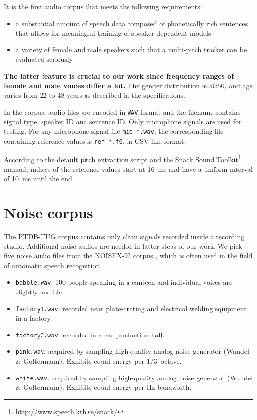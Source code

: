 \documentclass[11pt,a4paper]{report}
\begin{document}
It is the first audio corpus that meets the following requirements:

\begin{itemize}
  \item a substantial amount of speech data composed of phonetically rich sentences that allows for meaningful training of speaker-dependent models
  \item a variety of female and male speakers such that a multi-pitch tracker can be evaluated seriously
\end{itemize}

\textbf{The latter feature is crucial to our work since frequency ranges of female and male voices differ a lot.} The gender distribution is 50:50, and age varies from 22 to 48 years as described in the specifications.

\bigskip

In the corpus, audio files are encoded in \texttt{WAV} format and the filename contains signal type, speaker ID and sentence ID\@.
Only microphone signals are used for testing.
For any microphone signal file \texttt{mic\_*.wav}, the corresponding file containing reference values is \texttt{ref\_*.f0}, in CSV-like format.

According to the default pitch extraction script and the Snack Sound Toolkit\footnote{\url{http://www.speech.kth.se/snack/}} manual, indices of the reference values start at \SI{16}{\milli\second} and have a uniform interval of \SI{10}{\milli\second} until the end.

\section{Noise corpus}

The PTDB-TUG corpus contains only clean signals recorded inside a recording studio.
Additional noise audios are needed in latter steps of our work.
We pick five noise audio files from the NOISEX-92 corpus \parencite{varga1993assessment}, which is often used in the field of automatic speech recognition.

\begin{itemize}
  \item \texttt{babble.wav}: 100 people speaking in a canteen and individual voices are slightly audible.
  \item \texttt{factory1.wav}: recorded near plate-cutting and electrical welding equipment in a factory.
  \item \texttt{factory2.wav}: recorded in a car production hall.
  \item \texttt{pink.wav}: acquired by sampling high-quality analog noise generator (Wandel \& Goltermann).
    Exhibits equal energy per \SI{1/3}{octave}.
  \item \texttt{white.wav}: acquired by sampling high-quality analog noise generator (Wandel \& Goltermann).
    Exhibits equal energy per \si{\hertz} bandwidth.
\end{itemize}
\end{document}
